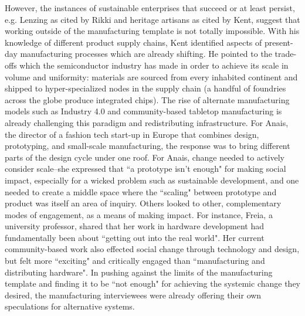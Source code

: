 However, the instances of sustainable enterprises that succeed or at least persist, e.g. Lenzing as cited by Rikki and heritage artisans as cited by Kent, suggest that working outside of the manufacturing template is not totally impossible.
With his knowledge of different product supply chains, Kent identified aspects of present-day manufacturing processes which are already shifting. He pointed to the trade-offs which the semiconductor industry has made in order to achieve its scale in volume and uniformity: materials are sourced from every inhabited continent and shipped to hyper-specialized nodes in the supply chain (a handful of foundries across the globe produce integrated chips). The rise of alternate manufacturing models such as Industry 4.0 and community-based tabletop manufacturing \cite{machado_sustainable_2020, kohtala_making_2017} is already challenging this paradigm and redistributing infrastructure. For Anais, the director of a fashion tech start-up in Europe that combines design, prototyping, and small-scale manufacturing, the response was to bring different parts of the design cycle under one roof. For Anais, change needed to actively consider scale--she expressed that ``a prototype isn't enough" for making social impact, especially for a wicked problem such as sustainable development, and one needed to create a middle space where the ``scaling" between prototype and product was itself an area of inquiry. Others looked to other, complementary modes of engagement, as a means of making impact. For instance, Freia, a university professor, shared that her work in hardware development had fundamentally been about ``getting out into the real world". Her current community-based work also effected social change through technology and design, but felt more ``exciting" and critically engaged than ``manufacturing and distributing hardware". In pushing against the limits of the manufacturing template and finding it to be ``not enough" for achieving the systemic change they desired, the manufacturing interviewees were already offering their own speculations for alternative systems. 
